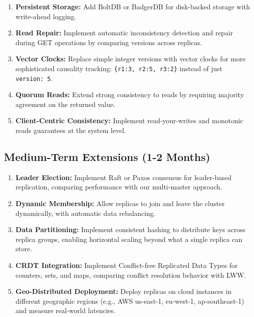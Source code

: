 \documentclass[10pt,a4paper]{article}
\begin{document}
\begin{enumerate}
    \item \textbf{Persistent Storage:} Add BoltDB or BadgerDB for disk-backed storage with write-ahead logging.
    
    \item \textbf{Read Repair:} Implement automatic inconsistency detection and repair during GET operations by comparing versions across replicas.
    
    \item \textbf{Vector Clocks:} Replace simple integer versions with vector clocks for more sophisticated causality tracking: \texttt{\{r1:3, r2:5, r3:2\}} instead of just \texttt{version: 5}.
    
    \item \textbf{Quorum Reads:} Extend strong consistency to reads by requiring majority agreement on the returned value.
    
    \item \textbf{Client-Centric Consistency:} Implement read-your-writes and monotonic reads guarantees at the system level.
\end{enumerate}

\subsection{Medium-Term Extensions (1-2 Months)}

\begin{enumerate}
    \item \textbf{Leader Election:} Implement Raft or Paxos consensus for leader-based replication, comparing performance with our multi-master approach.
    
    \item \textbf{Dynamic Membership:} Allow replicas to join and leave the cluster dynamically, with automatic data rebalancing.
    
    \item \textbf{Data Partitioning:} Implement consistent hashing to distribute keys across replica groups, enabling horizontal scaling beyond what a single replica can store.
    
    \item \textbf{CRDT Integration:} Implement Conflict-free Replicated Data Types for counters, sets, and maps, comparing conflict resolution behavior with LWW.
    
    \item \textbf{Geo-Distributed Deployment:} Deploy replicas on cloud instances in different geographic regions (e.g., AWS us-east-1, eu-west-1, ap-southeast-1) and measure real-world latencies.
\end{enumerate}
\end{document}
